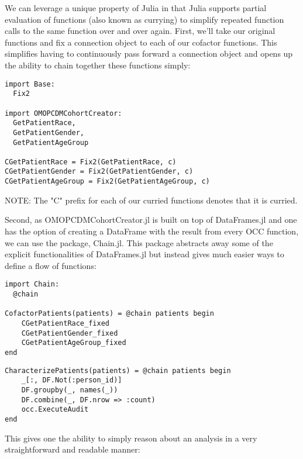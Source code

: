 \documentclass{juliacon}
\begin{document}
We can leverage a unique property of Julia in that Julia supports partial evaluation of functions (also known as currying) to simplify repeated function calls to the same function over and over again.
First, we'll take our original functions and fix a connection object to each of our cofactor functions.
This simplifies having to continuously pass forward a connection object and opens up the ability to chain together these functions simply:

\begin{verbatim}
import Base:
  Fix2

import OMOPCDMCohortCreator:
  GetPatientRace,
  GetPatientGender,
  GetPatientAgeGroup

CGetPatientRace = Fix2(GetPatientRace, c)
CGetPatientGender = Fix2(GetPatientGender, c)
CGetPatientAgeGroup = Fix2(GetPatientAgeGroup, c)
\end{verbatim}

NOTE: The "C" prefix for each of our curried functions denotes that it is curried.

Second, as OMOPCDMCohortCreator.jl is built on top of DataFrames.jl and one has the option of creating a DataFrame with the result from every OCC function, we can use the package, Chain.jl.
This package abstracts away some of the explicit functionalities of DataFrames.jl but instead gives much easier ways to define a flow of functions:

\begin{verbatim}
import Chain:
  @chain

CofactorPatients(patients) = @chain patients begin
    CGetPatientRace_fixed
    CGetPatientGender_fixed
    CGetPatientAgeGroup_fixed
end
\end{verbatim}

\begin{verbatim}
CharacterizePatients(patients) = @chain patients begin
    _[:, DF.Not(:person_id)]
    DF.groupby(_, names(_))
    DF.combine(_, DF.nrow => :count)
    occ.ExecuteAudit
end
\end{verbatim}

This gives one the ability to simply reason about an analysis in a very straightforward and readable manner:
\end{document}
